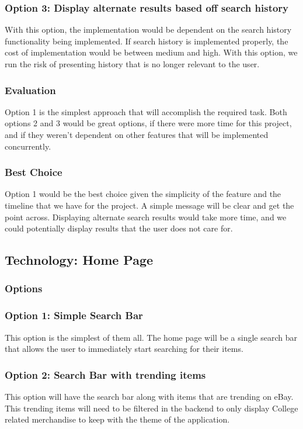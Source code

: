 \documentclass[journal,compsoc, 10pt, draftclsnofoot, onecolumn]{IEEEtran}
\begin{document}
\subsubsection*{Option 3: Display alternate results based off search history}
With this option, the implementation would be dependent on the search history 
functionality being implemented. If search history is implemented properly, 
the cost of implementation would be between medium and high. With this option, 
we run the risk of presenting history that is no longer relevant to the user. 
\subsubsection{Evaluation}
Option 1 is the simplest approach that will accomplish the required task. Both options 2 and 3 would be great options, if there were more time for this project, and if they weren't dependent on other features that will be implemented concurrently.
\subsubsection{Best Choice}
Option 1 would be the best choice given the simplicity of the feature and the 
timeline that we have for the project. A simple message will be clear and get 
the point across. Displaying alternate search results would take more time, 
and we could potentially display results that the user does not care for.

\subsection{Technology: Home Page}
\subsubsection{Options}
\subsubsection*{Option 1: Simple Search Bar}
This option is the simplest of them all. The home page will be a single search 
bar that allows the user to immediately start searching for their items. 
\subsubsection*{Option 2: Search Bar with trending items}
This option will have the search bar along with items that are trending on eBay. 
This trending items will need to be filtered in the backend to only display College related merchandise to keep with the theme of the application. 
\end{document}
